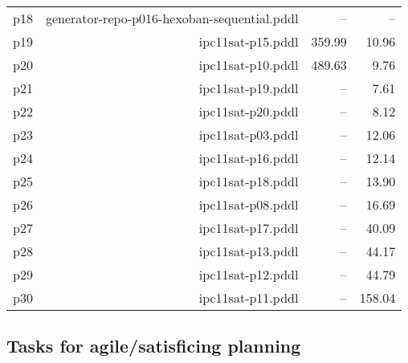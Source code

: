 \documentclass{article}
\begin{document}
\begin{center}
\begin{tabular}{@{}l|r|r|r@{}}
  p18& generator-repo-p016-hexoban-sequential.pddl&--&--\\
  p19& ipc11sat-p15.pddl&359.99&10.96\\
  p20& ipc11sat-p10.pddl&489.63&9.76\\
  p21& ipc11sat-p19.pddl&--&7.61\\
  p22& ipc11sat-p20.pddl&--&8.12\\
  p23& ipc11sat-p03.pddl&--&12.06\\
  p24& ipc11sat-p16.pddl&--&12.14\\
  p25& ipc11sat-p18.pddl&--&13.90\\
  p26& ipc11sat-p08.pddl&--&16.69\\
  p27& ipc11sat-p17.pddl&--&40.09\\
  p28& ipc11sat-p13.pddl&--&44.17\\
  p29& ipc11sat-p12.pddl&--&44.79\\
  p30& ipc11sat-p11.pddl&--&158.04
                            \end{tabular}
                            \end{center}
                    

                    \subsection*{Tasks for agile/satisficing planning}
                    
\end{document}
